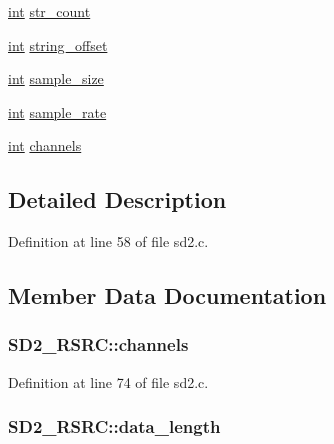 \begin{DoxyCompactItemize}
\item 
\hyperlink{xmltok_8h_a5a0d4a5641ce434f1d23533f2b2e6653}{int} \hyperlink{struct_s_d2___r_s_r_c_a78d27f07a451da00cabb85aefa0389cf}{str\+\_\+count}
\item 
\hyperlink{xmltok_8h_a5a0d4a5641ce434f1d23533f2b2e6653}{int} \hyperlink{struct_s_d2___r_s_r_c_aed7669bfd2fdad452edd28e3cc796108}{string\+\_\+offset}
\item 
\hyperlink{xmltok_8h_a5a0d4a5641ce434f1d23533f2b2e6653}{int} \hyperlink{struct_s_d2___r_s_r_c_a10ec4be407e409d9dfa10babe9aadd1f}{sample\+\_\+size}
\item 
\hyperlink{xmltok_8h_a5a0d4a5641ce434f1d23533f2b2e6653}{int} \hyperlink{struct_s_d2___r_s_r_c_a5d06dab8ba1c4192eb4bdebedf213ace}{sample\+\_\+rate}
\item 
\hyperlink{xmltok_8h_a5a0d4a5641ce434f1d23533f2b2e6653}{int} \hyperlink{struct_s_d2___r_s_r_c_a859c2fa2742fd0caab62553265f143e8}{channels}
\end{DoxyCompactItemize}


\subsection{Detailed Description}


Definition at line 58 of file sd2.\+c.



\subsection{Member Data Documentation}
\subsubsection[{\texorpdfstring{channels}{channels}}]{ S\+D2\+\_\+\+R\+S\+R\+C\+::channels}\hypertarget{struct_s_d2___r_s_r_c_a859c2fa2742fd0caab62553265f143e8}{}\label{struct_s_d2___r_s_r_c_a859c2fa2742fd0caab62553265f143e8}


Definition at line 74 of file sd2.\+c.

\subsubsection[{\texorpdfstring{data\+\_\+length}{data_length}}]{ S\+D2\+\_\+\+R\+S\+R\+C\+::data\+\_\+length}\hypertarget{struct_s_d2___r_s_r_c_a5676006382ec5fdaad49ab44d67a94ea}{}\label{struct_s_d2___r_s_r_c_a5676006382ec5fdaad49ab44d67a94ea}



